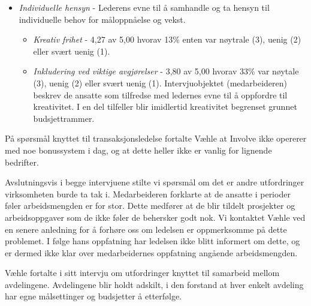 \begin{itemize}
\item\textit{Individuelle hensyn} - Lederens evne til å samhandle og ta hensyn til individuelle behov for måloppnåelse og vekst.
\begin{itemize}
\item\textit{Kreativ frihet} - 4,27 av 5,00 hvorav 13\% enten var nøytrale (3), uenig (2) eller svært uenig (1). 
\item\textit{Inkludering ved viktige avgjørelser} - 3,80 av 5,00 hvorav 33\% var nøytale (3), uenig (2) eller svært uenig (1).
Intervjuobjektet (medarbeideren) beskrev de ansatte som tilfredse med ledernes evne til å oppfordre til kreativitet. I en del tilfeller blir imidlertid kreativitet begrenset grunnet budsjettrammer.
\end{itemize}
\end{itemize}

\indent \newline
På spørsmål knyttet til transaksjonsledelse fortalte Væhle at Involve ikke opererer med noe bonussystem i dag, og at dette heller ikke er vanlig for lignende bedrifter. 

\indent \newline
Avslutningsvis i begge intervjuene stilte vi spørsmål om det er andre utfordringer virksomheten burde ta tak i. Medarbeideren forklarte at de ansatte i perioder føler arbeidsmengden er for stor. Dette medfører at de blir tildelt prosjekter og arbeidsoppgaver som de ikke føler de behersker godt nok. Vi kontaktet Væhle ved en senere anledning for å forhøre oss om ledelsen er oppmerksomme på dette problemet. I følge hans oppfatning har ledelsen ikke blitt informert om dette, og er dermed ikke klar over medarbeidernes oppfatning angående arbeidsmengden. 

\indent \newline
Væhle fortalte i sitt intervju om utfordringer knyttet til samarbeid mellom avdelingene. Avdelingene blir holdt adskilt, i den forstand at hver enkelt avdeling har egne målsettinger og budsjetter å etterfølge. 
